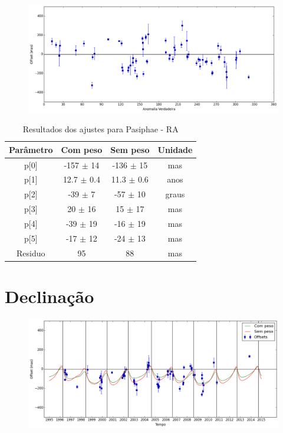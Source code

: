 \documentclass[11pt,a4paper]{report}
\begin{document}
\begin{figure}[h]
\includegraphics[scale=0.45]{Pasiphae/RA_anom.png}  
\end{figure}

\begin{table}[h!]
\caption{\label{Tab: Pasiphae-RA} Resultados dos ajustes para Pasiphae - RA}
\begin{centering}
\begin{tabular}{cccc}
\hline
\hline
Parâmetro & Com peso & Sem peso & Unidade\tabularnewline
\hline
p[0] & -157 $\pm$ 14 & -136 $\pm$ 15 & mas\\
p[1] & 12.7 $\pm$ 0.4 & 11.3 $\pm$ 0.6 & anos\\
p[2] & -39 $\pm$ 7 & -57 $\pm$ 10 & graus\\
p[3] & 20 $\pm$ 16 & 15 $\pm$ 17 & mas\\
p[4] & -39 $\pm$ 19 & -16 $\pm$ 19 & mas\\
p[5] & -17 $\pm$ 12 & -24 $\pm$ 13 & mas\\
Residuo & 95 & 88 & mas\\
\hline 
\end{tabular} 
\par\end{centering}
\end{table}

\section*{Declinação}

\begin{figure}[h]
\includegraphics[scale=0.45]{Pasiphae/DEC.png} 
\end{figure}
\end{document}
